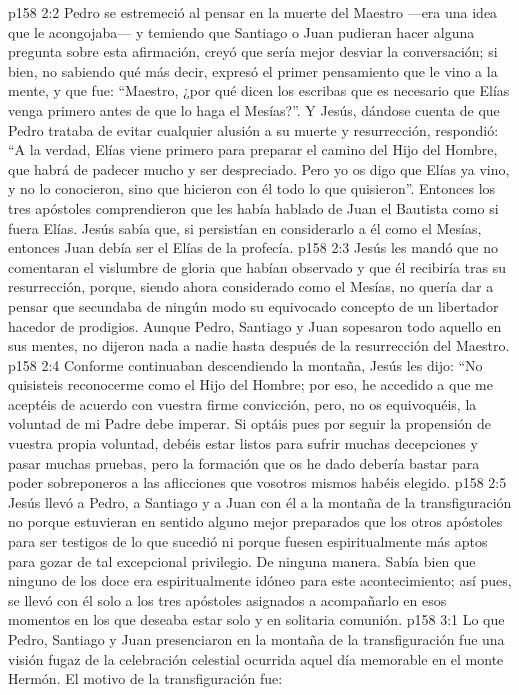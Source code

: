 \vs p158 2:2 Pedro se estremeció al pensar en la muerte del Maestro ---era una idea que le acongojaba--- y temiendo que Santiago o Juan pudieran hacer alguna pregunta sobre esta afirmación, creyó que sería mejor desviar la conversación; si bien, no sabiendo qué más decir, expresó el primer pensamiento que le vino a la mente, y que fue: “Maestro, ¿por qué dicen los escribas que es necesario que Elías venga primero antes de que lo haga el Mesías?”. Y Jesús, dándose cuenta de que Pedro trataba de evitar cualquier alusión a su muerte y resurrección, respondió: “A la verdad, Elías viene primero para preparar el camino del Hijo del Hombre, que habrá de padecer mucho y ser despreciado. Pero yo os digo que Elías ya vino, y no lo conocieron, sino que hicieron con él todo lo que quisieron”. Entonces los tres apóstoles comprendieron que les había hablado de Juan el Bautista como si fuera Elías. Jesús sabía que, si persistían en considerarlo a él como el Mesías, entonces Juan debía ser el Elías de la profecía.
\vs p158 2:3 Jesús les mandó que no comentaran el vislumbre de gloria que habían observado y que él recibiría tras su resurrección, porque, siendo ahora considerado como el Mesías, no quería dar a pensar que secundaba de ningún modo su equivocado concepto de un libertador hacedor de prodigios. Aunque Pedro, Santiago y Juan sopesaron todo aquello en sus mentes, no dijeron nada a nadie hasta después de la resurrección del Maestro.
\vs p158 2:4 Conforme continuaban descendiendo la montaña, Jesús les dijo: “No quisisteis reconocerme como el Hijo del Hombre; por eso, he accedido a que me aceptéis de acuerdo con vuestra firme convicción, pero, no os equivoquéis, la voluntad de mi Padre debe imperar. Si optáis pues por seguir la propensión de vuestra propia voluntad, debéis estar listos para sufrir muchas decepciones y pasar muchas pruebas, pero la formación que os he dado debería bastar para poder sobreponeros a las aflicciones que vosotros mismos habéis elegido.
\vs p158 2:5 Jesús llevó a Pedro, a Santiago y a Juan con él a la montaña de la transfiguración no porque estuvieran en sentido alguno mejor preparados que los otros apóstoles para ser testigos de lo que sucedió ni porque fuesen espiritualmente más aptos para gozar de tal excepcional privilegio. De ninguna manera. Sabía bien que ninguno de los doce era espiritualmente idóneo para este acontecimiento; así pues, se llevó con él solo a los tres apóstoles asignados a acompañarlo en esos momentos en los que deseaba estar solo y en solitaria comunión.
\vs p158 3:1 Lo que Pedro, Santiago y Juan presenciaron en la montaña de la transfiguración fue una visión fugaz de la celebración celestial ocurrida aquel día memorable en el monte Hermón. El motivo de la transfiguración fue:
